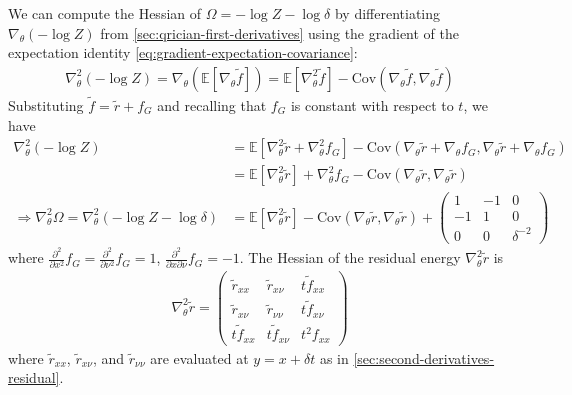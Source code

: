 \documentclass{article}
\begin{document}
We can compute the Hessian of $\Omega = -\log Z - \log\delta$ by differentiating $\nabla_{\theta} (-\log Z)$ from \cref{sec:qrician-first-derivatives} using the gradient of the expectation identity \cref{eq:gradient-expectation-covariance}:
%
\begin{align}
  \nabla_{\theta}^2 (-\log Z) = \nabla_\theta ( \mathbb{E}[\nabla_{\theta} \tilde{f}] ) = \mathbb{E}[\nabla_{\theta}^2 \tilde{f}] - \mathrm{Cov}(\nabla_{\theta} \tilde{f}, \nabla_{\theta} \tilde{f})
\end{align}
%
Substituting $\tilde{f} = \tilde{r} + f_G$ and recalling that $f_G$ is constant with respect to $t$, we have
%
\begin{align}
  \nabla_{\theta}^2 (-\log Z)                                                     & = \mathbb{E}[\nabla_{\theta}^2 \tilde{r} + \nabla_{\theta}^2 f_G] - \mathrm{Cov}(\nabla_{\theta} \tilde{r} + \nabla_{\theta} f_G, \nabla_{\theta} \tilde{r} + \nabla_{\theta} f_G)  \\
                                                                                  & = \mathbb{E}[\nabla_{\theta}^2 \tilde{r}] + \nabla_{\theta}^2 f_G - \mathrm{Cov}(\nabla_{\theta} \tilde{r}, \nabla_{\theta} \tilde{r}) \label{eq:residual-hessian-neglogz}          \\
  \Rightarrow \nabla_{\theta}^2 \Omega = \nabla_{\theta}^2 (-\log Z - \log\delta) & = \mathbb{E}[\nabla_{\theta}^2 \tilde{r}] - \mathrm{Cov}(\nabla_{\theta} \tilde{r}, \nabla_{\theta} \tilde{r}) + \begin{pmatrix} 1 & -1 & 0 \\ -1 & 1 & 0 \\ 0 & 0 & \delta^{-2} \end{pmatrix} \label{eq:residual-hessian-qrician}
\end{align}
%
where $\frac{\partial^2}{\partial x^2} f_G = \frac{\partial^2}{\partial \nu^2} f_G = 1$, $\frac{\partial^2}{\partial x \partial \nu} f_G = -1$.
The Hessian of the residual energy $\nabla_{\theta}^2 \tilde{r}$ is
%
\begin{align}
  \nabla_{\theta}^2 \tilde{r} = \begin{pmatrix} \tilde{r}_{xx} & \tilde{r}_{x\nu} & t \tilde{f}_{xx} \\ \tilde{r}_{x\nu} & \tilde{r}_{\nu\nu} & t \tilde{f}_{x\nu} \\ t \tilde{f}_{xx} & t \tilde{f}_{x\nu} & t^2 f_{xx} \end{pmatrix}
\end{align}
%
where $\tilde{r}_{xx}$, $\tilde{r}_{x\nu}$, and $\tilde{r}_{\nu\nu}$ are evaluated at $y=x + \delta t$ as in \cref{sec:second-derivatives-residual}.
\end{document}
